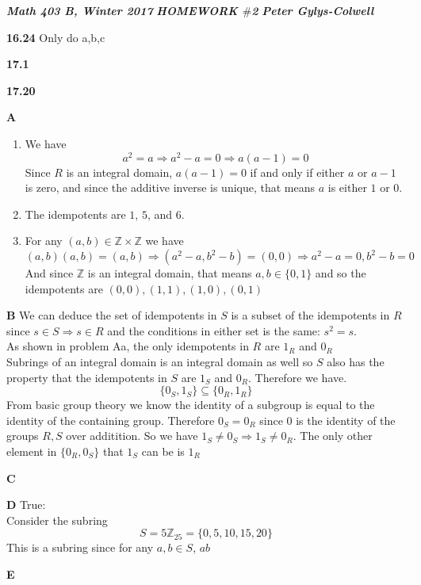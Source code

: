 \documentclass[12pt]{article}
\newenvironment{ques}{\vspace{2 ex}}{\vspace{2 ex}}
\theoremstyle{definition}
\begin{document}
\noindent \textit{\textbf{Math 403 B, Winter 2017}} \hspace{1.3cm}
\textit{\textbf{HOMEWORK $\#$2}} \hspace{1.3cm} \textit{\textbf{Peter
Gylys-Colwell}} 

\vspace{1cm}

\begin{ques}
	\textbf{16.24} Only do a,b,c
\end{ques}

\begin{ques}
	\textbf{17.1}
\end{ques}

\begin{ques}
	\textbf{17.20}
\end{ques}

\begin{ques}
	\textbf{A}
	\begin{enumerate}
		\item
		We have
		$$a^2 = a \Rightarrow a^2 - a = 0 \Rightarrow a(a - 1) = 0$$
		Since $R$ is an integral domain, $a(a-1) = 0$ if and only if
		either $a$ or $a-1$ is zero, and since the additive inverse is
		unique, that means $a$ is either $1$ or $0$.
		\item
		The idempotents are $1$, $5$, and $6$.
		\item
		For any $(a,b) \in
		\mathbb Z \times \mathbb Z$ we have 
		$$(a, b)(a, b) = (a, b) \Rightarrow (a^2 - a, b^2 - b) = (0,0)
		\Rightarrow a^2 - a =0, b^2 - b = 0$$
		And since $\mathbb Z$ is an integral domain, that means $a,b
		\in \{0, 1\}$ and so the idempotents are $(0,0), (1,1), (1,0),
		(0,1)$
	\end{enumerate}
\end{ques}

\begin{ques}
	\textbf{B}
	We can deduce the set of idempotents in $S$ is a subset of
	the idempotents in $R$ since $s \in S \Rightarrow s \in R$ and the
	conditions in either set is the same: $s^2 = s$.\\
	As shown in problem Aa, the only idempotents in $R$ are $1_R$ and $0_R$\\
	Subrings of an integral domain is an integral domain as well so $S$
	also has the property that the idempotents in $S$ are $1_S$ and $0_R$.
	Therefore we have.
	$$\{0_S, 1_S\} \subseteq \{0_R, 1_R\}$$
	From basic group theory we know the identity of a subgroup is equal to
	the identity of the containing group. Therefore $0_S = 0_R$ since $0$
	is the identity of the groups $R, S$ over additition. So we have $1_S
	\neq 0_S \Rightarrow 1_S \neq 0_R$. The only other element in $\{0_R,
	0_S\}$ that $1_S$ can be is $1_R$
\end{ques}

\begin{ques}
	\textbf{C}
	
\end{ques}

\begin{ques}
	\textbf{D}
	True:\\
	Consider the subring
	$$S = 5\mathbb Z _{25} = \{0, 5, 10, 15, 20\}$$
	This is a subring since for any $a, b \in S$, $ab$
\end{ques}

\begin{ques}
	\textbf{E}
\end{ques}
\end{document}
